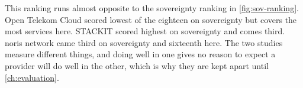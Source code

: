 This ranking runs almost opposite to the sovereignty ranking in
\cref{fig:sov-ranking}. Open Telekom Cloud scored lowest of the eighteen on
sovereignty but covers the most services here. STACKIT scored highest on sovereignty
and comes third. noris network came third on sovereignty and sixteenth here. The two
studies measure different things, and doing well in one gives no reason to expect a
provider will do well in the other, which is why they are kept apart until
\cref{ch:evaluation}.
